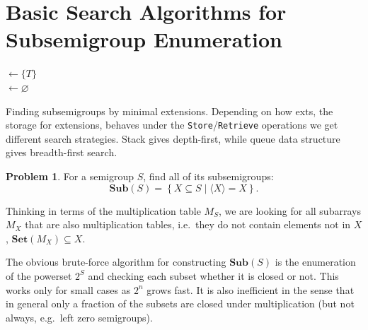 \documentclass{amsart}
\newcommand{\Sub}{\mathbf{Sub}}
\newcommand{\Set}{\mathbf{Set}}
\theoremstyle{plain}
\theoremstyle{definition}
\newtheorem{problem}[theorem]{Problem}
\begin{document}
\section{Basic Search Algorithms for Subsemigroup Enumeration}
\label{sec:enum}
\begin{algorithm}[t]
\BlankLine
\Name{}
\subs $\leftarrow \{T\}$\\
\exts $\leftarrow \varnothing$\\
\Return \subs
\caption{Finding subsemigroups by minimal extensions. Depending on how \textsf{exts}, the storage for extensions, behaves under the \texttt{Store}/\texttt{Retrieve} operations we get different search strategies. Stack gives depth-first, while queue data structure gives breadth-first search.}
\label{alg:minclosure}
\end{algorithm}

\begin{problem}
For a semigroup $S$, find all of its subsemigroups:
$$\Sub(S)=\left\{ X\subseteq S\mid \langle X\rangle=X\right\}.$$
\end{problem}
Thinking in terms of the multiplication table $M_S$, we are looking for all subarrays $M_X$ that are also multiplication tables, i.e.\ they do not contain elements not in $X$, $\Set(M_X)\subseteq X$.

The obvious brute-force algorithm for constructing $\Sub(S)$ is the enumeration of the powerset $2^S$ and checking each subset whether it is closed or not.
This works only for small cases as $2^n$ grows fast.
It is also inefficient in the sense that in general only a fraction of the
subsets are closed under multiplication (but not always, e.g.\ left zero
semigroups).
 
\end{document}
